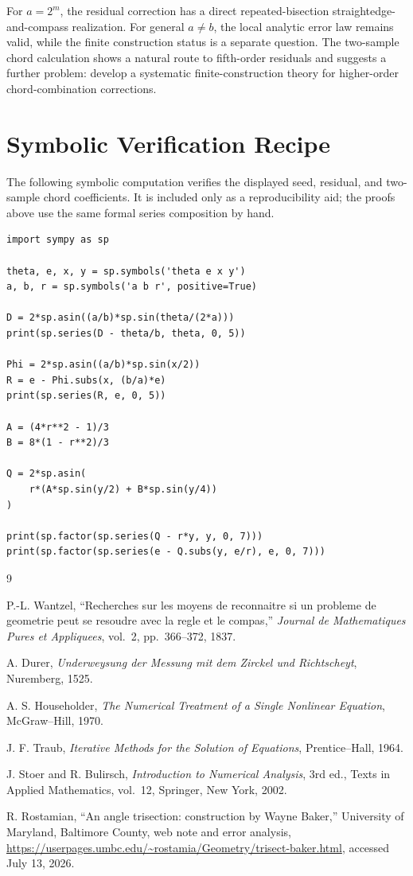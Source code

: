\documentclass[11pt]{article}
\theoremstyle{definition}
\theoremstyle{remark}
\begin{document}
For $a=2^m$, the residual correction has a direct repeated-bisection
straightedge-and-compass realization.  For general $a\ne b$, the local analytic
error law remains valid, while the finite construction status is a separate
question.  The two-sample chord calculation shows a natural route to
fifth-order residuals and suggests a further problem: develop a systematic
finite-construction theory for higher-order chord-combination corrections.

\appendix

\section{Symbolic Verification Recipe}
\label{app:symbolic}

The following symbolic computation verifies the displayed seed, residual, and
two-sample chord coefficients.  It is included only as a reproducibility aid;
the proofs above use the same formal series composition by hand.

\begin{verbatim}
import sympy as sp

theta, e, x, y = sp.symbols('theta e x y')
a, b, r = sp.symbols('a b r', positive=True)

D = 2*sp.asin((a/b)*sp.sin(theta/(2*a)))
print(sp.series(D - theta/b, theta, 0, 5))

Phi = 2*sp.asin((a/b)*sp.sin(x/2))
R = e - Phi.subs(x, (b/a)*e)
print(sp.series(R, e, 0, 5))

A = (4*r**2 - 1)/3
B = 8*(1 - r**2)/3

Q = 2*sp.asin(
    r*(A*sp.sin(y/2) + B*sp.sin(y/4))
)

print(sp.factor(sp.series(Q - r*y, y, 0, 7)))
print(sp.factor(sp.series(e - Q.subs(y, e/r), e, 0, 7)))
\end{verbatim}

\begin{thebibliography}{9}

P.-L. Wantzel,
``Recherches sur les moyens de reconnaitre si un probleme de geometrie peut se resoudre avec la regle et le compas,''
\emph{Journal de Mathematiques Pures et Appliquees}, vol.~2, pp.~366--372, 1837.

A. Durer,
\emph{Underweysung der Messung mit dem Zirckel und Richtscheyt},
Nuremberg, 1525.

A. S. Householder,
\emph{The Numerical Treatment of a Single Nonlinear Equation},
McGraw--Hill, 1970.

J. F. Traub,
\emph{Iterative Methods for the Solution of Equations},
Prentice--Hall, 1964.

J. Stoer and R. Bulirsch,
\emph{Introduction to Numerical Analysis}, 3rd ed.,
Texts in Applied Mathematics, vol.~12, Springer, New York, 2002.

R. Rostamian,
``An angle trisection: construction by Wayne Baker,''
University of Maryland, Baltimore County, web note and error analysis,
\url{https://userpages.umbc.edu/~rostamia/Geometry/trisect-baker.html},
accessed July 13, 2026.

\end{thebibliography}
\end{document}
